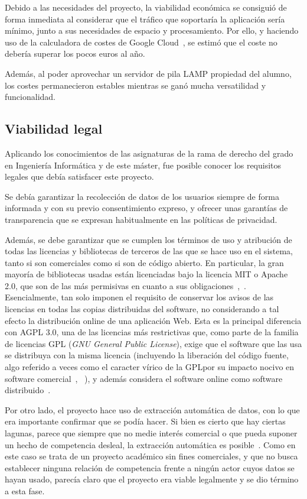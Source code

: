 Debido a las necesidades del proyecto, la viabilidad económica se consiguió de forma inmediata al considerar que el tráfico que soportaría la aplicación sería mínimo, junto a sus necesidades de espacio y procesamiento. Por ello, y haciendo uso de la calculadora de costes de Google Cloud~\cite{calculadora_app_engine}, se estimó que el coste no debería superar los pocos euros al año.

Además, al poder aprovechar un servidor de pila LAMP propiedad del alumno, los costes permanecieron estables mientras se ganó mucha versatilidad y funcionalidad.

\subsection{Viabilidad legal}

Aplicando los conocimientos de las asignaturas de la rama de derecho del grado en Ingeniería Informática y de este máster, fue posible conocer los requisitos legales que debía satisfacer este proyecto.

Se debía garantizar la recolección de datos de los usuarios siempre de forma informada y con su previo consentimiento expreso, y ofrecer unas garantías de transparencia que se expresan habitualmente en las políticas de privacidad.

Además, se debe garantizar que se cumplen los términos de uso y atribución de todas las licencias y bibliotecas de terceros de las que se hace uso en el sistema, tanto si son comerciales como si son de código abierto. En particular, la gran mayoría de bibliotecas usadas están licenciadas bajo la licencia MIT o Apache 2.0, que son de las más permisivas en cuanto a sus obligaciones~\cite{MIT},~\cite{Apache2}. Esencialmente, tan solo imponen el requisito de conservar los avisos de las licencias en todas las copias distribuidas del software, no considerando a tal efecto la distribución online de una aplicación Web. Esta es la principal diferencia con AGPL 3.0, una de las licencias más restrictivas que, como parte de la familia de licencias GPL (\textit{GNU General Public License}), exige que el software que las usa se distribuya con la misma licencia (incluyendo la liberación del código fuente, algo referido a veces como \guillemotleft el caracter vírico de la GPL\guillemotright\space por su impacto nocivo en software comercial~\cite{licencia_virica}, ~\cite{GPL}), y además considera el software online como software distribuido~\cite{AGPL}.

Por otro lado, el proyecto hace uso de extracción automática de datos, con lo que era importante confirmar que se podía hacer. Si bien es cierto que hay ciertas lagunas, parece que siempre que no medie interés comercial o que pueda suponer un hecho de competencia desleal, la extracción automática es posible~\cite{scraping_legal}. Como en este caso se trata de un proyecto académico sin fines comerciales, y que no busca establecer ninguna relación de competencia frente a ningún actor cuyos datos se hayan usado, parecía claro que el proyecto era viable legalmente y se dio término a esta fase.